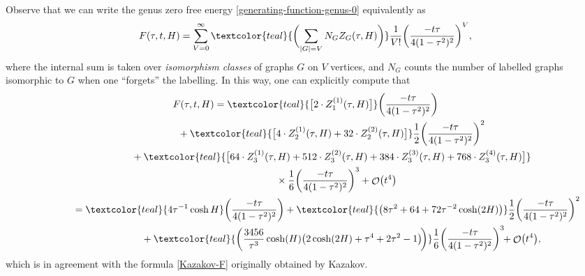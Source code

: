 \documentclass[10pt,a4paper]{amsart}
\DeclareMathOperator{\OO}{\mathcal{O}}
\numberwithin{equation}{section}
\begin{document}
Observe that we can write the genus zero free energy \eqref{generating-function-genus-0} equivalently as
 \begin{equation*}
 F(\tau,t,H) = \sum_{V=0}^{\infty} \textcolor{teal}{\biggl(\sum_{|G| = V} N_G Z_G(\tau,H) \biggr)}\frac{1}{V!}\biggl(\frac{-t\tau}{4(1-\tau^2)^2}\biggr)^V,
 \end{equation*}
where the internal sum is taken over \textit{isomorphism classes} of graphs $G$ on $V$ vertices, and $N_G$ counts the number of labelled graphs isomorphic to $G$ when one ``forgets''
the labelling. In this way, one can explicitly compute that
 \begin{gather*}
 F(\tau,t,H) = \textcolor{teal}{\bigl[2\cdot Z_1^{(1)}(\tau,H)\bigr]}\biggl(\frac{-t\tau}{4(1-\tau^2)^2}\biggr) \\
 \hphantom{F(\tau,t,H) =}{}
 + \textcolor{teal}{\bigl[4 \cdot Z_2^{(1)}(\tau,H) + 32\cdot Z_2^{(2)}(\tau,H)\bigr]}\frac{1}{2}\biggl(\frac{-t\tau}{4(1-\tau^2)^2}\biggr)^2\\
 \hphantom{F(\tau,t,H) =}{}
 + \textcolor{teal}{\bigl[64\cdot Z_3^{(1)}(\tau,H) + 512\cdot Z_3^{(2)}(\tau,H) + 384\cdot Z_3^{(3)}(\tau,H) + 768\cdot Z_3^{(4)}(\tau,H)\bigr]}\\
 \hphantom{F(\tau,t,H) =}{}\quad
 \times\frac{1}{6}\biggl(\frac{-t\tau}{4(1-\tau^2)^2}\biggr)^3+ \OO\bigl(t^4\bigr)\\
 \hphantom{F(\tau,t,H)}{}=
 \textcolor{teal}{4\tau^{-1}\cosh{H}}\biggl(\frac{-t\tau}{4(1-\tau^2)^2}\biggr) + \textcolor{teal}{\bigl(8\tau^2 + 64+72\tau^{-2}\cosh(2H)\bigr)}\frac{1}{2}\biggl(\frac{-t\tau}{4(1-\tau^2)^2}\biggr)^2\\
 \hphantom{F(\tau,t,H) =}{}
 \qquad{}+ \textcolor{teal}{\biggl(\frac{3456}{\tau^3}\cosh(H)\bigl(2\cosh(2H)+\tau^4+2\tau^2-1\bigr)\!\biggr)}\frac{1}{6}\biggl(\frac{-t\tau}{4(1-\tau^2)^2}\biggr)^3\!\! + \OO\bigl(t^4\bigr),
 \end{gather*}
which is in agreement with the formula \eqref{Kazakov-F} originally obtained by Kazakov.
\end{document}
